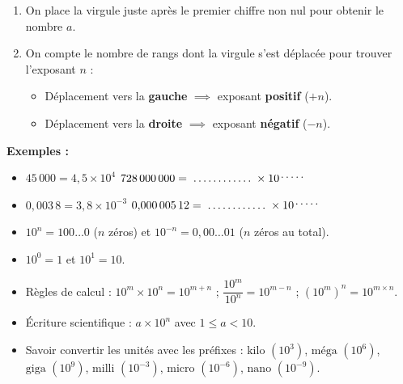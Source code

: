 \begin{cadremethode}
\begin{enumerate}
    \item On place la virgule juste après le premier chiffre non nul pour obtenir le nombre $a$.
    \item On compte le nombre de rangs dont la virgule s'est déplacée pour trouver l'exposant $n$ :
    \begin{itemize}
        \item Déplacement vers la \textbf{gauche} $\implies$ exposant \textbf{positif} ($+n$).
        \item Déplacement vers la \textbf{droite} $\implies$ exposant \textbf{négatif} ($-n$).
    \end{itemize}
\end{enumerate}

\textbf{Exemples :}
\begin{itemize}
    \item $45\,000 = 4{,}5 \times 10^4$ \hfill $728\,000\,000 = \pointille[2cm] \times 10^{\pointille[0.8cm]}$
    \item $0{,}003\,8 = 3{,}8 \times 10^{-3}$ \hfill $0{,}000\,005\,12 = \pointille[2cm] \times 10^{\pointille[0.8cm]}$
\end{itemize}
\end{cadremethode}

\begin{cadreretenu}
\begin{itemize}
    \item $10^n = 100\dots0$ ($n$ zéros) \quad et \quad $10^{-n} = 0{,}00\dots01$ ($n$ zéros au total).
    \item $10^0 = 1$ \quad et \quad $10^1 = 10$.
    \item Règles de calcul : $10^m \times 10^n = 10^{m+n}$ \quad ; \quad $\dfrac{10^m}{10^n} = 10^{m-n}$ \quad ; \quad $(10^m)^n = 10^{m \times n}$.
    \item Écriture scientifique : $a \times 10^n$ avec $1 \leq a < 10$.
    \item Savoir convertir les unités avec les préfixes : $\text{kilo } (10^3)$, $\text{méga } (10^6)$, $\text{giga } (10^9)$, $\text{milli } (10^{-3})$, $\text{micro } (10^{-6})$, $\text{nano } (10^{-9})$.
\end{itemize}
\end{cadreretenu}

